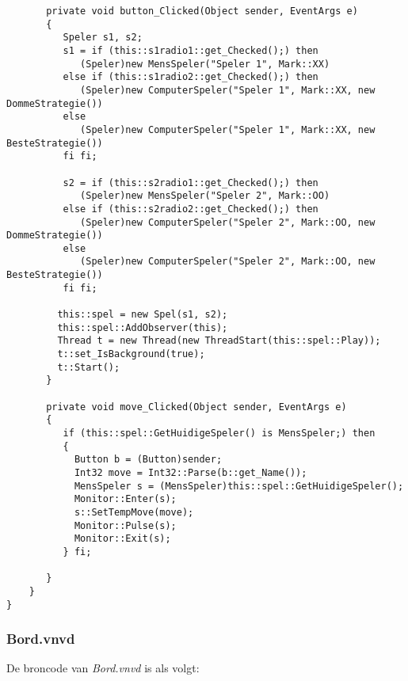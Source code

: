 \begin{lstlisting}
	   private void button_Clicked(Object sender, EventArgs e)
	   {
	      Speler s1, s2;
	      s1 = if (this::s1radio1::get_Checked();) then
	         (Speler)new MensSpeler("Speler 1", Mark::XX)
	      else if (this::s1radio2::get_Checked();) then
	         (Speler)new ComputerSpeler("Speler 1", Mark::XX, new DommeStrategie())
	      else
	         (Speler)new ComputerSpeler("Speler 1", Mark::XX, new BesteStrategie())
	      fi fi;
	      
	      s2 = if (this::s2radio1::get_Checked();) then
	         (Speler)new MensSpeler("Speler 2", Mark::OO)
	      else if (this::s2radio2::get_Checked();) then
	         (Speler)new ComputerSpeler("Speler 2", Mark::OO, new DommeStrategie())
	      else
	         (Speler)new ComputerSpeler("Speler 2", Mark::OO, new BesteStrategie())
	      fi fi;
	      
         this::spel = new Spel(s1, s2);
         this::spel::AddObserver(this);
         Thread t = new Thread(new ThreadStart(this::spel::Play));
         t::set_IsBackground(true);
         t::Start();
	   }
	   
	   private void move_Clicked(Object sender, EventArgs e)
	   {
	      if (this::spel::GetHuidigeSpeler() is MensSpeler;) then
	      {
	      	Button b = (Button)sender;
            Int32 move = Int32::Parse(b::get_Name());
            MensSpeler s = (MensSpeler)this::spel::GetHuidigeSpeler();
            Monitor::Enter(s);
            s::SetTempMove(move);
            Monitor::Pulse(s);
            Monitor::Exit(s);
	      } fi;

	   }
	}
}
\end{lstlisting}

\subsubsection{Bord.vnvd}
De broncode van \textit{Bord.vnvd} is als volgt:

